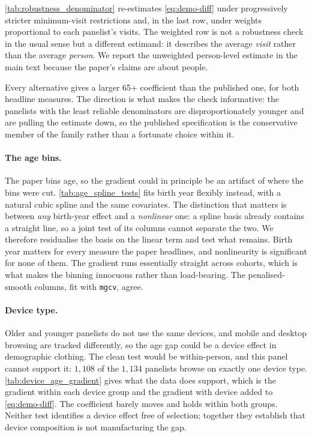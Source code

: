 \documentclass[12pt, letterpaper]{article}
\begin{document}
\cref{tab:robustness_denominator} re-estimates \cref{eq:demo-diff} under progressively stricter minimum-visit restrictions and, in the last row, under weights proportional to each panelist's visits. The weighted row is not a robustness check in the usual sense but a different estimand: it describes the average \textit{visit} rather than the average \textit{person}. We report the unweighted person-level estimate in the main text because the paper's claims are about people.
 
Every alternative gives a larger 65+ coefficient than the published one, for both headline measures. The direction is what makes the check informative: the panelists with the least reliable denominators are disproportionately younger and are pulling the estimate down, so the published specification is the conservative member of the family rather than a fortunate choice within it.
 
\paragraph{The age bins.}
The paper bins age, so the gradient could in principle be an artifact of where the bins were cut. \cref{tab:age_spline_tests} fits birth year flexibly instead, with a natural cubic spline and the same covariates. The distinction that matters is between \textit{any} birth-year effect and a \textit{nonlinear} one: a spline basis already contains a straight line, so a joint test of its columns cannot separate the two.
We therefore residualise the basis on the linear term and test what remains. Birth year matters for every measure the paper headlines, and nonlinearity is significant for none of them. The gradient runs essentially straight across cohorts, which is what makes the binning innocuous rather than load-bearing. The penalised-smooth columns, fit with \texttt{mgcv}, agree.
 
\paragraph{Device type.}
Older and younger panelists do not use the same devices, and mobile and desktop browsing are tracked differently, so the age gap could be a device effect in demographic clothing. The clean test would be within-person, and this panel cannot support it: $1{,}108$ of the $1{,}134$ panelists browse on exactly one device type. \cref{tab:device_age_gradient} gives what the data does support, which is the gradient within each device group and the gradient with device added to \cref{eq:demo-diff}. The coefficient barely moves and holds within both groups.
Neither test identifies a device effect free of selection; together they establish that device composition is not manufacturing the gap.
 
\end{document}

